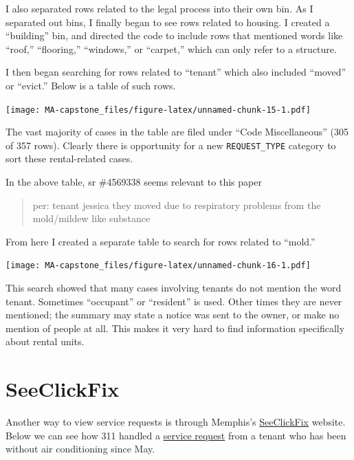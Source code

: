 \documentclass[
  openany]{book}
\begin{document}
I also separated rows related to the legal process into their own bin. As I separated out bins, I finally began to see rows related to housing. I created a ``building'' bin, and directed the code to include rows that mentioned words like ``roof,'' ``flooring,'' ``windows,'' or ``carpet,'' which can only refer to a structure.

I then began searching for rows related to ``tenant'' which also included ``moved'' or ``evict.'' Below is a table of such rows.

\texttt{[image: MA-capstone\_files/figure-latex/unnamed-chunk-15-1.pdf]}

The vast majority of cases in the table are filed under ``Code Miscellaneous'' (305 of 357 rows). Clearly there is opportunity for a new \texttt{REQUEST\_TYPE} category to sort these rental-related cases.

In the above table, sr \#4569338 seems relevant to this paper

\begin{quote}
per: tenant jessica they moved due to respiratory problems from the mold/mildew like substance
\end{quote}

From here I created a separate table to search for rows related to ``mold.''

\texttt{[image: MA-capstone\_files/figure-latex/unnamed-chunk-16-1.pdf]}

This search showed that many cases involving tenants do not mention the word tenant. Sometimes ``occupant'' or ``resident'' is used. Other times they are never mentioned; the summary may state a notice was sent to the owner, or make no mention of people at all. This makes it very hard to find information specifically about rental units.

\hypertarget{seeclickfix}{%
\section{SeeClickFix}\label{seeclickfix}}

Another way to view service requests is through Memphis's \href{https://seeclickfix.com/web_portal/DaM5B2x33WeFNJ1zpUeDRvCB/issues/map?lat=35.14896833842707\&lng=-90.05163922905923\&max_lat=35.15402992416014\&max_lng=-90.04691720008852\&min_lat=35.143906437842766\&min_lng=-90.05635857582094\&zoom=17}{SeeClickFix} website. Below we can see how 311 handled a \href{https://seeclickfix.com/web_portal/DaM5B2x33WeFNJ1zpUeDRvCB/issues/10508076}{service request} from a tenant who has been without air conditioning since May.
\end{document}
